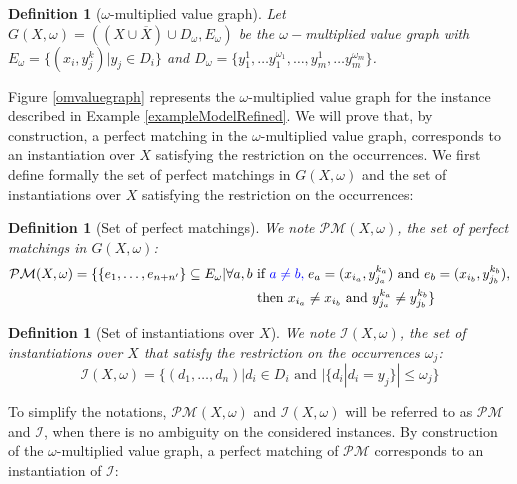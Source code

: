 \documentclass[jair,twoside,11pt,theapa]{article}
\newtheorem{definition}[theorem]{Definition}
\newcommand{\minor}[1]{\textcolor{blue}{#1}}
\newcommand{\var}[1]{x_{#1}}
\newcommand{\Domain}{D}
\newcommand{\domainof}[1]{\Domain_{#1}}
\begin{document}
\begin{definition}[$\omega$-multiplied value graph]
	Let $G(X, \omega)=((X \cup \overline{X}) \cup \Domain_{\omega}, E_{\omega} )$ be the $\omega-$multiplied value graph with $E_{\omega} =\lbrace (\var{i},y_j^k) | y_j \in \domainof{i} \rbrace$ and $D_{\omega}=\lbrace y_1^1, \ldots y_1^{\omega_1}, \ldots , y_m^1, \ldots y_m^{\omega_m} \rbrace$.
\end{definition}

Figure \ref{omvaluegraph} represents the $\omega$-multiplied value graph for the instance described in Example \ref{exampleModelRefined}.
We will prove that, by construction, a perfect matching in the $\omega$-multiplied value graph, corresponds to an instantiation over $X$ satisfying the restriction on the occurrences. We first define formally the set of perfect matchings in $G(X, \omega)$ and the set of instantiations over $X$ satisfying the restriction on the occurrences:

\begin{definition}[Set of perfect matchings]
	We note $\mathcal{PM}(X, \omega)$, the set of perfect matchings in $G(X,\omega)$:
	\begin{align*}
		\mathcal{PM}(X, \omega) = \lbrace \lbrace e_1, \ldots,  e_{n+n'} \rbrace \subseteq E_{\omega} | \forall a,b &\text{ if } \minor{a \neq b,} \; e_a = (x_{i_a}, y_{j_a}^{k_a}) \text{ and } e_b = (x_{i_b}, y_{j_b}^{k_b}), \\
		&\text{ then } x_{i_a} \neq x_{i_b} \text{ and } y_{j_a}^{k_a} \neq y_{j_b}^{k_b} \rbrace
	\end{align*}
\end{definition}


\begin{definition}[Set of instantiations over $X$]
	We note $\mathcal{I}(X, \omega)$, the set of instantiations over $X$ that satisfy the restriction on the occurrences $\omega_j$:
	\begin{equation*}
		\mathcal{I}(X,\omega) = \lbrace (d_1, \ldots, d_n) | d_i \in D_i \text{ and } |\lbrace d_i | d_i=y_j \rbrace| \leq \omega_j \rbrace
	\end{equation*}
\end{definition}

 To simplify the notations, $\mathcal{PM}(X,\omega)$ and $\mathcal{I}(X,\omega)$ will be referred to as $\mathcal{PM}$ and $\mathcal{I}$, when there is no ambiguity on the considered instances. By construction of the $\omega$-multiplied value graph, a perfect matching of $\mathcal{PM}$ corresponds to an instantiation of $\mathcal{I}$:
 
\end{document}
